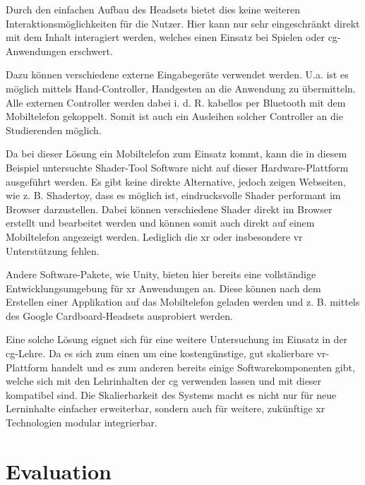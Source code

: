 \documentclass[conference]{IEEEtran}
\begin{document}
Durch den einfachen Aufbau des Headsets bietet dies keine weiteren Interaktionsmöglichkeiten für die Nutzer.
Hier kann nur sehr eingeschränkt direkt mit dem Inhalt interagiert werden, welches einen Einsatz bei Spielen oder \gls{cg}-Anwendungen erschwert.


Dazu können verschiedene externe Eingabegeräte verwendet werden.
U.a. ist es möglich mittels Hand-Controller, Handgesten an die Anwendung zu übermitteln.
Alle externen Controller werden dabei i. d. R. kabellos per Bluetooth mit dem Mobiltelefon gekoppelt.
Somit ist auch ein Ausleihen solcher Controller an die Studierenden möglich.

Da bei dieser Lösung ein Mobiltelefon zum Einsatz kommt, kann die in diesem Beispiel untersuchte Shader-Tool Software\cite{shadertool} nicht auf dieser Hardware-Plattform ausgeführt werden.
Es gibt keine direkte Alternative, jedoch zeigen Webseiten, wie z. B. Shadertoy\cite{shadertoy}, dass es möglich ist, eindrucksvolle Shader performant im Browser darzustellen.
Dabei können verschiedene Shader direkt im Browser erstellt und bearbeitet werden und können somit auch direkt auf einem Mobiltelefon angezeigt werden.
Lediglich die \gls{xr} oder insbesondere \gls{vr} Unterstützung fehlen.

Andere Software-Pakete, wie Unity\cite{unity3d}, bieten hier bereits eine vollständige Entwicklungsumgebung für \gls{xr} Anwendungen an.
Diese können nach dem Erstellen einer Applikation auf das Mobiltelefon geladen werden und z. B. mittels des Google Cardboard-Headsets\cite{googlecardboard} ausprobiert werden.

Eine solche Lösung eignet sich für eine weitere Untersuchung im Einsatz in der \gls{cg}-Lehre.
Da es sich zum einen um eine kostengünstige, gut skalierbare \gls{vr}-Plattform handelt und es zum anderen bereits einige Softwarekomponenten gibt, 
welche sich mit den Lehrinhalten der \gls{cg} verwenden lassen und mit dieser kompatibel sind.
Die Skalierbarkeit des Systems macht es nicht nur für neue Lerninhalte einfacher erweiterbar, sondern auch für weitere, zukünftige \gls{xr} Technologien modular integrierbar.





\section{Evaluation}
\end{document}
